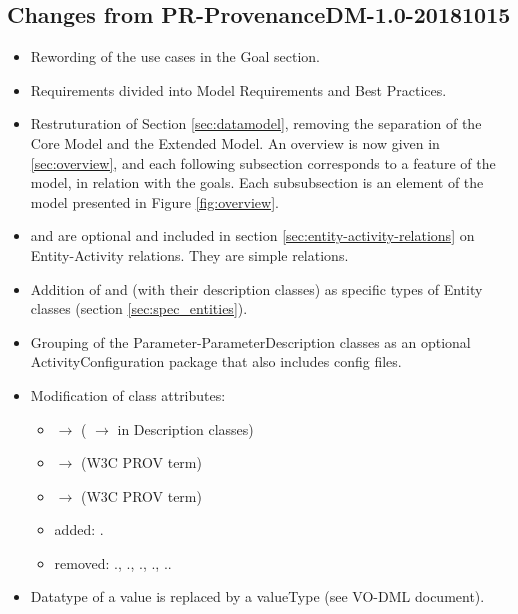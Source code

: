 
\subsection{Changes from PR-ProvenanceDM-1.0-20181015}

\begin{itemize}
\item Rewording of the use cases in the Goal section.
\item Requirements divided into Model Requirements and Best Practices.
\item Restruturation of Section \ref{sec:datamodel}, removing the separation of the Core Model and the Extended Model. An overview is now given in \ref{sec:overview}, and each following subsection corresponds to a feature of the model, in relation with the goals. Each subsubsection is an element of the model presented in Figure \ref{fig:overview}.
\item {} and  are optional and included in section \ref{sec:entity-activity-relations} on Entity-Activity relations. They are simple relations.
\item Addition of  and  (with their description classes) as specific types of Entity classes (section \ref{sec:spec_entities}).
\item Grouping of the Parameter-ParameterDescription classes as an optional ActivityConfiguration package that also includes config files.
\item Modification of class attributes: 
\begin{itemize}
  \item {} $\rightarrow$  ( $\rightarrow$  in Description classes)
  \item {} $\rightarrow$  (W3C PROV term)
  \item {} $\rightarrow$  (W3C PROV term)
  \item added: .
  \item removed: ., ., ., ., ..
\end{itemize}
\item Datatype of a value is replaced by a valueType (see VO-DML document).

\end{itemize}
